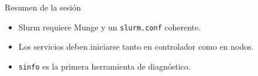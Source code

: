 \documentclass[aspectratio=169,professionalfonts]{beamer}
\begin{document}
\begin{frame}[fragile]{Resumen de la sesión}
  \begin{itemize}
    \item Slurm requiere Munge y un \texttt{slurm.conf} coherente.
    \item Los servicios deben iniciarse tanto en controlador como en nodos.
    \item \texttt{sinfo} es la primera herramienta de diagnóstico.
  \end{itemize}
\end{frame}
\end{document}
